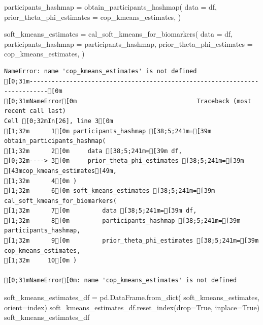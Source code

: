 \documentclass[
  letterpaper,
  DIV=11,
  numbers=noendperiod]{scrreprt}
\newenvironment{Shaded}{\begin{snugshade}}{\end{snugshade}}
\newcommand{\NormalTok}[1]{\textcolor[rgb]{0.00,0.23,0.31}{#1}}
\newcommand{\OperatorTok}[1]{\textcolor[rgb]{0.37,0.37,0.37}{#1}}
\newcommand{\StringTok}[1]{\textcolor[rgb]{0.13,0.47,0.30}{#1}}
\newcommand{\VariableTok}[1]{\textcolor[rgb]{0.07,0.07,0.07}{#1}}
\begin{document}
\begin{Shaded}
\begin{Highlighting}[]
\NormalTok{participants\_hashmap }\OperatorTok{=}\NormalTok{ obtain\_participants\_hashmap(}
\NormalTok{    data }\OperatorTok{=}\NormalTok{ df, }
\NormalTok{    prior\_theta\_phi\_estimates }\OperatorTok{=}\NormalTok{ cop\_kmeans\_estimates,}
\NormalTok{)}

\NormalTok{soft\_kmeans\_estimates }\OperatorTok{=}\NormalTok{ cal\_soft\_kmeans\_for\_biomarkers(}
\NormalTok{        data }\OperatorTok{=}\NormalTok{ df,}
\NormalTok{        participants\_hashmap }\OperatorTok{=}\NormalTok{ participants\_hashmap,}
\NormalTok{        prior\_theta\_phi\_estimates }\OperatorTok{=}\NormalTok{ cop\_kmeans\_estimates,}
\NormalTok{)}
\end{Highlighting}
\end{Shaded}

\begin{verbatim}
NameError: name 'cop_kmeans_estimates' is not defined
[0;31m---------------------------------------------------------------------------[0m
[0;31mNameError[0m                                 Traceback (most recent call last)
Cell [0;32mIn[26], line 3[0m
[1;32m      1[0m participants_hashmap [38;5;241m=[39m obtain_participants_hashmap(
[1;32m      2[0m     data [38;5;241m=[39m df, 
[0;32m----> 3[0m     prior_theta_phi_estimates [38;5;241m=[39m [43mcop_kmeans_estimates[49m,
[1;32m      4[0m )
[1;32m      6[0m soft_kmeans_estimates [38;5;241m=[39m cal_soft_kmeans_for_biomarkers(
[1;32m      7[0m         data [38;5;241m=[39m df,
[1;32m      8[0m         participants_hashmap [38;5;241m=[39m participants_hashmap,
[1;32m      9[0m         prior_theta_phi_estimates [38;5;241m=[39m cop_kmeans_estimates,
[1;32m     10[0m )

[0;31mNameError[0m: name 'cop_kmeans_estimates' is not defined
\end{verbatim}

\begin{Shaded}
\begin{Highlighting}[]
\NormalTok{soft\_kmeans\_estimates\_df }\OperatorTok{=}\NormalTok{ pd.DataFrame.from\_dict(}
\NormalTok{    soft\_kmeans\_estimates, orient}\OperatorTok{=}\StringTok{\textquotesingle{}index\textquotesingle{}}\NormalTok{)}
\NormalTok{soft\_kmeans\_estimates\_df.reset\_index(drop}\OperatorTok{=}\VariableTok{True}\NormalTok{, inplace}\OperatorTok{=}\VariableTok{True}\NormalTok{)}
\NormalTok{soft\_kmeans\_estimates\_df}
\end{Highlighting}
\end{Shaded}
\end{document}
